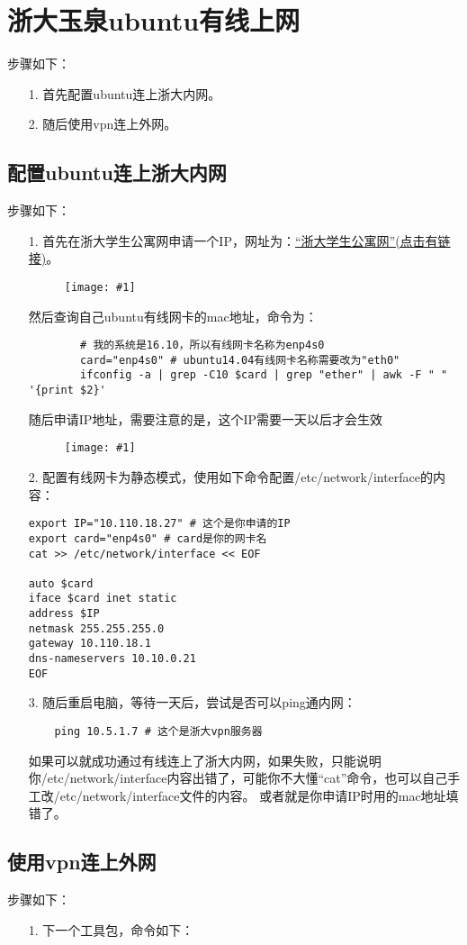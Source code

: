 \documentclass[a4paper,left=2.5cm,right=2.5cm,11pt]{article}
\newcommand{\fic}[1]{\begin{figure}[H]
		\center
		\texttt{[image: \#1]}
	\end{figure}}
\begin{document}
\tableofcontents

\clearpage

\section{浙大玉泉ubuntu有线上网}
	步骤如下：
	\begin{itemize}
		\item[1.] 首先配置ubuntu连上浙大内网。
		\item[2.] 随后使用vpn连上外网。
	\end{itemize}

\subsection{配置ubuntu连上浙大内网}
	步骤如下：
	\begin{itemize}
		\item[1.] 首先在浙大学生公寓网申请一个IP，网址为：\href{http://service.chinasinew.com/zjuauth.aspx?syscode=zjuserv&redirect_url=http\%3a\%2f\%2fservice.chinasinew.com\%2flogin.ashx&sign=D41EC7A9AF38DDF5F5C7FAED27B08CB1}{“浙大学生公寓网”(点击有链接)}。
		          \fic{1.png}

				  然后查询自己ubuntu有线网卡的mac地址，命令为：
				  \begin{lstlisting}
		# 我的系统是16.10，所以有线网卡名称为enp4s0
		card="enp4s0" # ubuntu14.04有线网卡名称需要改为"eth0"
		ifconfig -a | grep -C10 $card | grep "ether" | awk -F " " '{print $2}' 
				  \end{lstlisting}

				  随后申请IP地址，需要注意的是，这个IP需要一天以后才会生效
				  \fic{2.png}

		\item[2.] 配置有线网卡为静态模式，使用如下命令配置/etc/network/interface的内容：
		\begin{lstlisting}
export IP="10.110.18.27" # 这个是你申请的IP
export card="enp4s0" # card是你的网卡名
cat >> /etc/network/interface << EOF

auto $card
iface $card inet static
address $IP
netmask 255.255.255.0
gateway 10.110.18.1
dns-nameservers 10.10.0.21
EOF
		\end{lstlisting}

		\item[3.] 随后重启电脑，等待一天后，尝试是否可以ping通内网：
		\begin{lstlisting}
	ping 10.5.1.7 # 这个是浙大vpn服务器
		\end{lstlisting}

		如果可以就成功通过有线连上了浙大内网，如果失败，只能说明你/etc/network/interface内容出错了，可能你不大懂“cat”命令，也可以自己手工改/etc/network/interface文件的内容。
		或者就是你申请IP时用的mac地址填错了。
	\end{itemize}

\subsection{使用vpn连上外网}
	步骤如下：
	\begin{itemize}
		\item[1.] 下一个工具包，命令如下：
		\begin{lstlisting}
	
		\end{lstlisting}
	\end{itemize}
\end{document}
